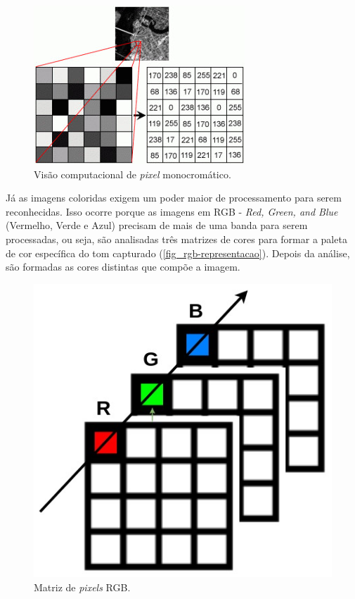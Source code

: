 \begin{figure}[h]
	\caption{\label{fig_rep-pixel-monocromatico}Visão computacional de \textit{pixel} monocromático.}
	\begin{center}
		\includegraphics[scale=3.5]{4-Conteudo-Bibliografico/2-Visao-Computacional/Imagens-Visao-Computacional/rep-pixel-monocromatico.jpg}
	\end{center}
	\centering {}
\end{figure}

Já as imagens coloridas exigem um poder maior de processamento para serem reconhecidas. Isso ocorre porque as imagens em RGB - \textit{Red, Green, and Blue} (Vermelho, Verde e Azul)  precisam de mais de uma banda para serem processadas, ou seja, são analisadas três matrizes de cores para formar a paleta de cor específica do tom capturado (\autoref{fig_rgb-representacao}). Depois da análise, são formadas as cores distintas que compõe a imagem.

\begin{figure}[h]
	\caption{\label{fig_rgb-representacao}Matriz de \textit{pixels} RGB.}
	\begin{center}
		\includegraphics[scale=0.3]{4-Conteudo-Bibliografico/2-Visao-Computacional/Imagens-Visao-Computacional/rgb-representacao.jpg}
	\end{center}
	\centering {}
\end{figure}


